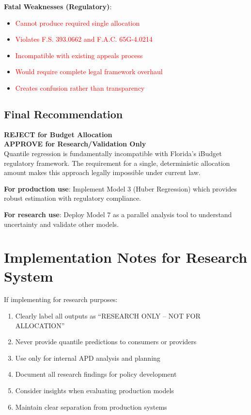 \textbf{Fatal Weaknesses (Regulatory)}:
\begin{itemize}
    \item \textcolor{red}{Cannot produce required single allocation}
    \item \textcolor{red}{Violates F.S. 393.0662 and F.A.C. 65G-4.0214}
    \item \textcolor{red}{Incompatible with existing appeals process}
    \item \textcolor{red}{Would require complete legal framework overhaul}
    \item \textcolor{red}{Creates confusion rather than transparency}
\end{itemize}

\subsection{Final Recommendation}

\begin{center}
\colorbox{red!20}{
\begin{minipage}{0.9\textwidth}
\centering
\textbf{\Large REJECT for Budget Allocation}\\[0.5em]
\textbf{\large APPROVE for Research/Validation Only}\\[0.5em]

Quantile regression is fundamentally incompatible with Florida's iBudget regulatory framework. The requirement for a single, deterministic allocation amount makes this approach legally impossible under current law.

\textbf{For production use}: Implement Model 3 (Huber Regression) which provides robust estimation with regulatory compliance.

\textbf{For research use}: Deploy Model 7 as a parallel analysis tool to understand uncertainty and validate other models.
\end{minipage}
}
\end{center}

\section{Implementation Notes for Research System}

If implementing for research purposes:

\begin{enumerate}
    \item Clearly label all outputs as ``RESEARCH ONLY -- NOT FOR ALLOCATION''
    \item Never provide quantile predictions to consumers or providers
    \item Use only for internal APD analysis and planning
    \item Document all research findings for policy development
    \item Consider insights when evaluating production models
    \item Maintain clear separation from production systems
\end{enumerate}

